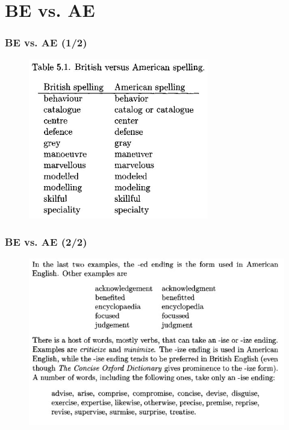 \documentclass{beamer}
\begin{document}
\section{BE vs. AE}
\begin{frame}
\frametitle{BE vs. AE (1/2)}
\begin{figure}[t]
 \includegraphics[width=0.7\textwidth]{images/be1.jpeg}
\end{figure}
\end{frame}
\begin{frame}
\frametitle{BE vs. AE (2/2)}
\begin{figure}[t]
 \includegraphics[width=\textwidth]{images/be2.jpeg}
\end{figure}
\end{frame}
\end{document}
